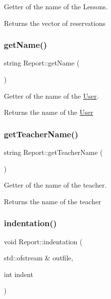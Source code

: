 Getter of the name of the Lessons. 

\begin{DoxyReturn}{Returns}
the vector of reservations 
\end{DoxyReturn}
\mbox{\label{class_report_aaeac48b6c10c5bbf240fc518b6d45d05}} 
\subsubsection{\texorpdfstring{get\+Name()}{getName()}}
{\footnotesize\ttfamily string Report\+::get\+Name (\begin{DoxyParamCaption}{ }\end{DoxyParamCaption})}



Getter of the name of the \mbox{\hyperlink{class_user}{User}}. 

\begin{DoxyReturn}{Returns}
the name of the \mbox{\hyperlink{class_user}{User}} 
\end{DoxyReturn}
\mbox{\label{class_report_af7c52b70f5fe6feae64e44affa6095cd}} 
\subsubsection{\texorpdfstring{get\+Teacher\+Name()}{getTeacherName()}}
{\footnotesize\ttfamily string Report\+::get\+Teacher\+Name (\begin{DoxyParamCaption}{ }\end{DoxyParamCaption})}



Getter of the name of the teacher. 

\begin{DoxyReturn}{Returns}
the name of the teacher 
\end{DoxyReturn}
\mbox{\label{class_report_a67a10004cf149f202015d55a14efe6c1}} 
\subsubsection{\texorpdfstring{indentation()}{indentation()}}
{\footnotesize\ttfamily void Report\+::indentation (\begin{DoxyParamCaption}\item[{std\+::ofstream \&}]{outfile,  }\item[{int}]{indent }\end{DoxyParamCaption})}



